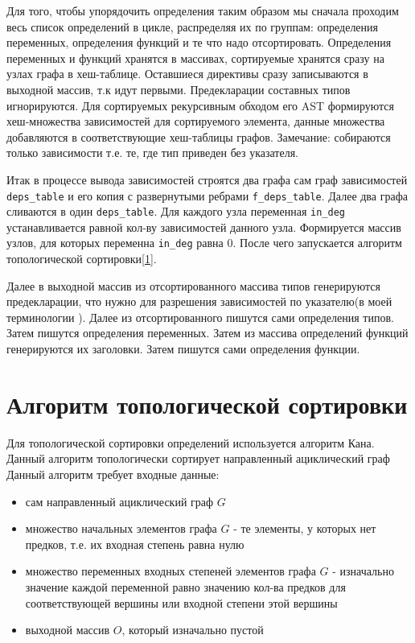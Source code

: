 Для того, чтобы упорядочить определения таким образом мы сначала проходим весь список определений в цикле, распределяя их по группам:
определения переменных, определения функций и те что надо отсортировать. Определения переменных и функций хранятся в массивах, сортируемые хранятся сразу на узлах графа в хеш-таблице.
Оставшиеся директивы сразу записываются в выходной массив, т.к идут первыми. Предекларации составных типов игнорируются.
Для сортируемых рекурсивным обходом его AST формируются хеш-множества зависимостей для сортируемого элемента, данные множества добавляются в соответствующие хеш-таблицы графов.
Замечание: собираются только  зависимости т.е. те, где тип приведен без указателя.

Итак в процессе вывода зависимостей строятся два графа сам граф зависимостей \verb|deps_table| и его копия с развернутыми ребрами \verb|f_deps_table|.
Далее два графа сливаются в один \verb|deps_table|.
Для каждого узла переменная \verb|in_deg| устанавливается равной кол-ву зависимостей данного узла.
Формируется массив узлов, для которых переменна \verb|in_deg| равна 0.
После чего запускается алгоритм топологической сортировки[\ref{pass:ordering:topsort}].

Далее в выходной массив из отсортированного массива типов генерируются предекларации, что нужно для разрешения зависимостей по указателю(в моей терминологии ).
Далее из отсортированного пишутся сами определения типов.
Затем пишутся определения переменных.
Затем из массива определений функций генерируются их заголовки.
Затем пишутся сами определения функции.

\section{Алгоритм топологической сортировки}
\label{pass:ordering:topsort}

Для топологической сортировки определений используется алгоритм Кана. Данный алгоритм топологически сортирует направленный ациклический граф
Данный алгоритм требует входные данные: 
\begin{itemize}
\item сам направленный ациклический граф $G$
\item множество начальных элементов графа $G$ - те элементы, у которых нет предков, т.е. их входная степень равна нулю
\item множество переменных входных степеней элементов графа $G$ - изначально значение каждой переменной равно значению кол-ва предков для соответствующей вершины или входной степени этой вершины
\item выходной массив $O$, который изначально пустой
\end{itemize}

